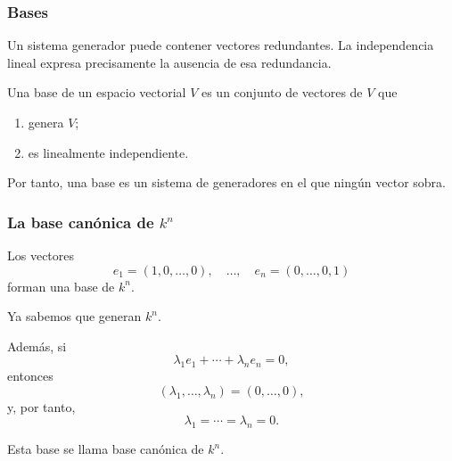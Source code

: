 \begin{frame}
    \frametitle{Bases}

    Un sistema generador puede contener vectores redundantes.
    La independencia lineal expresa precisamente la ausencia de esa
    redundancia.

    \begin{definition}
        Una \alert{base} de un espacio vectorial \(V\) es un conjunto
        de vectores de \(V\) que

        \begin{enumerate}
            \item genera \(V\);
            \item es linealmente independiente.
        \end{enumerate}
    \end{definition}

    \medskip

    Por tanto, una base es un sistema de generadores en el que
    ningún vector sobra.
\end{frame}


\begin{frame}
    \frametitle{La base canónica de \(k^n\)}

    \begin{example}
        Los vectores
        \[
            e_1=(1,0,\ldots,0),\quad\ldots,\quad
            e_n=(0,\ldots,0,1)
        \]
        forman una base de \(k^n\).

        Ya sabemos que generan \(k^n\).

        Además, si
        \[
            \lambda_1e_1+\cdots+\lambda_ne_n=0,
        \]
        entonces
        \[
            (\lambda_1,\ldots,\lambda_n)=(0,\ldots,0),
        \]
        y, por tanto,
        \[
            \lambda_1=\cdots=\lambda_n=0.
        \]
    \end{example}

    Esta base se llama \alert{base canónica} de \(k^n\).
\end{frame}



